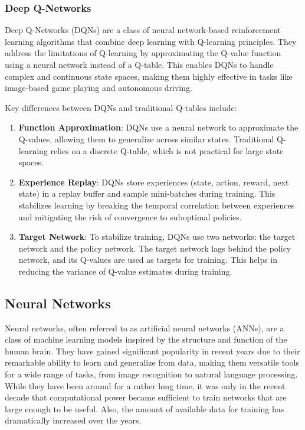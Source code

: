 \subsubsection{Deep Q-Networks}

Deep Q-Networks (DQNs) are a class of neural network-based reinforcement learning algorithms that combine deep learning with Q-learning principles. They address the limitations of Q-learning by approximating the Q-value function using a neural network instead of a Q-table. This enables DQNs to handle complex and continuous state spaces, making them highly effective in tasks like image-based game playing and autonomous driving.

Key differences between DQNs and traditional Q-tables include:

\begin{enumerate}
	\item \textbf{Function Approximation}: DQNs use a neural network to approximate the Q-values, allowing them to generalize across similar states. Traditional Q-learning relies on a discrete Q-table, which is not practical for large state spaces.
	
	\item \textbf{Experience Replay}: DQNs store experiences (state, action, reward, next state) in a replay buffer and sample mini-batches during training. This stabilizes learning by breaking the temporal correlation between experiences and mitigating the risk of convergence to suboptimal policies.
	
	\item \textbf{Target Network}: To stabilize training, DQNs use two networks: the target network and the policy network. The target network lags behind the policy network, and its Q-values are used as targets for training. This helps in reducing the variance of Q-value estimates during training.
\end{enumerate}


\subsection{Neural Networks}
Neural networks, often referred to as artificial neural networks (ANNs), are a class of machine learning models inspired by the structure and function of the human brain. They have gained significant popularity in recent years due to their remarkable ability to learn and generalize from data, making them versatile tools for a wide range of tasks, from image recognition to natural language processing. While they have been around for a rather long time, it was only in the recent decade that computational power became sufficient to train networks that are large enough to be useful. Also, the amount of available data for training has dramatically increased over the years.

